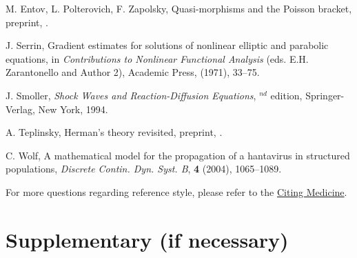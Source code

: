 \documentclass{aims}
\numberwithin{equation}{section}
\theoremstyle{definition}
\begin{document}
\begin{thebibliography}{99}
\newblock M. Entov, L. Polterovich, F. Zapolsky,
\newblock Quasi-morphisms and the Poisson bracket,
\newblock preprint, .

    \newblock J. Serrin,
    \newblock  Gradient estimates for solutions of nonlinear elliptic
                     and parabolic equations,
    \newblock  in \emph{Contributions to Nonlinear Functional Analysis} (eds. E.H. Zarantonello and Author 2),
                Academic Press, (1971), 33--75.

     \newblock J.  Smoller,
     \newblock \emph{Shock Waves and Reaction-Diffusion Equations},
     $^{nd}$ edition,  Springer-Verlag, New York, 1994.

\newblock A. Teplinsky,
\newblock Herman's theory revisited, preprint,
\newblock {}.

     \newblock C.  Wolf,
     \newblock A mathematical model for the propagation of a hantavirus in structured populations,
     \newblock \emph{Discrete Contin. Dyn. Syst. B}, \textbf{4} (2004), 1065--1089.

\end{thebibliography}


For more questions regarding reference style, please refer to the \href{http://www.ncbi.nlm.nih.gov/books/NBK7256/}{Citing Medicine}.

\section*{Supplementary (if necessary)}
\end{document}
